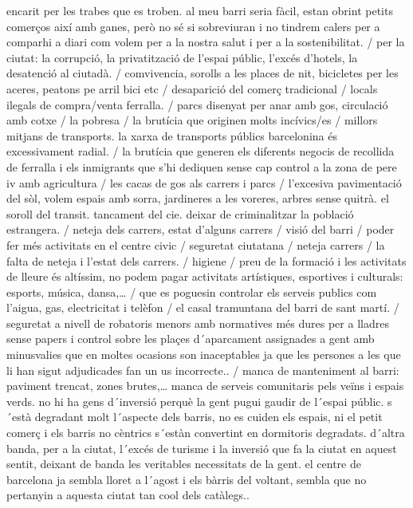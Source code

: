 \documentclass[]{article}
\begin{document}
{encarit per les trabes que es troben. al meu barri seria fàcil, estan
obrint petits comerços així amb ganes, però no sé si sobreviuran i no
tindrem calers per a comparhi a diari com volem per a la nostra salut i
per a la sostenibilitat. / per la ciutat: la corrupció, la privatització
de l'espai públic, l'excés d'hotels, la desatenció al ciutadà. /
comvivencia, sorolls a les places de nit, bicicletes per les aceres,
peatons pe arril bici etc / desaparició del comerç tradicional / locals
ilegals de compra/venta ferralla. / parcs disenyat per anar amb gos,
circulació amb cotxe / la pobresa / la brutícia que originen molts
incívics/es / millors mitjans de transports. la xarxa de transports
públics barcelonina és excessivament radial. / la brutícia que generen
els diferents negocis de recollida de ferralla i els inmigrants que s'hi
dediquen sense cap control a la zona de pere iv amb agricultura / les
cacas de gos als carrers i parcs / l'excesiva pavimentació del sòl,
volem espais amb sorra, jardineres a les voreres, arbres sense quitrà.
el soroll del transit. tancament del cie. deixar de criminalitzar la
població estrangera. / neteja dels carrers, estat d'alguns carrers /
visió del barri / poder fer més activitats en el centre civic /
seguretat ciutatana / neteja carrers / la falta de neteja i l'estat dels
carrers. / higiene / preu de la formació i les activitats de lleure és
altíssim, no podem pagar activitats artístiques, esportives i culturals:
esports, música, dansa,\ldots{} / que es poguesin controlar els serveis
publics com l'aigua, gas, electricitat i telèfon / el casal tramuntana
del barri de sant martí. / seguretat a nivell de robatoris menors amb
normatives més dures per a lladres sense papers i control sobre les
plaçes d´aparcament assignades a gent amb minusvalies que en moltes
ocasions son inaceptables ja que les persones a les que li han sigut
adjudicades fan un us incorrecte.. / manca de manteniment al barri:
paviment trencat, zones brutes,\ldots{} manca de serveis comunitaris
pels veïns i espais verds. no hi ha gens d´inversió perquè la gent pugui
gaudir de l´espai públic. s´està degradant molt l´aspecte dels barris,
no es cuiden els espais, ni el petit comerç i els barris no cèntrics
s´estàn convertint en dormitoris degradats. d´altra banda, per a la
ciutat, l´excés de turisme i la inversió que fa la ciutat en aquest
sentit, deixant de banda les veritables necessitats de la gent. el
centre de barcelona ja sembla lloret a l´agost i els bàrris del voltant,
sembla que no pertanyin a aquesta ciutat tan cool dels catàlegs.}.
\end{document}

